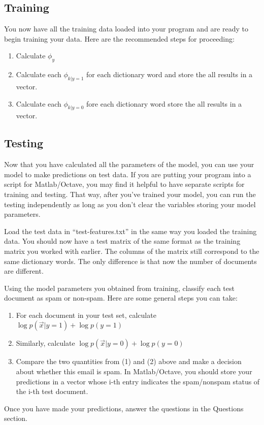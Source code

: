 \documentclass[10pt,a4paper]{article}
\begin{document}
  \subsection{Training}
  You now have all the training data loaded into your program and are ready to begin training your data. Here are the recommended steps for proceeding:
  \begin{enumerate}
    \item Calculate $\phi_{y}$
    \item Calculate each  $\phi_{k\vert y=1}$ for each dictionary word and store the all results in a vector.
    \item Calculate each  $\phi_{k\vert y=0}$ fore each dictionary word store the all results in a vector.
  \end{enumerate}



  \subsection{Testing}
  Now that you have calculated all the parameters of the model, you can use your model to make predictions on test data. If you are putting your program into a script for Matlab/Octave, you may find it helpful to have separate scripts for training and testing. That way, after you've trained your model, you can run the testing independently as long as you don't clear the variables storing your model parameters.

  Load the test data in ``test-features.txt'' in the same way you loaded the training data. You should now have a test matrix of the same format as the training matrix you worked with earlier. The columns of the matrix still correspond to the same dictionary words. The only difference is that now the number of documents are different.

  Using the model parameters you obtained from training, classify each test document as spam or non-spam. Here are some general steps you can take:
  \begin{enumerate}
    \item For each document in your test set, calculate  $\log p(\vec{x} \vert y = 1) + \log p(y=1)$
    \item Similarly, calculate  $\log p(\vec{x} \vert y = 0) + \log p(y=0)$
    \item Compare the two quantities from (1) and (2) above and make a decision about whether this email is spam. In Matlab/Octave, you should store your predictions in a vector whose i-th entry indicates the spam/nonspam status of the i-th test document.
  \end{enumerate}
  Once you have made your predictions, answer the questions in the Questions section.
  
\end{document}
